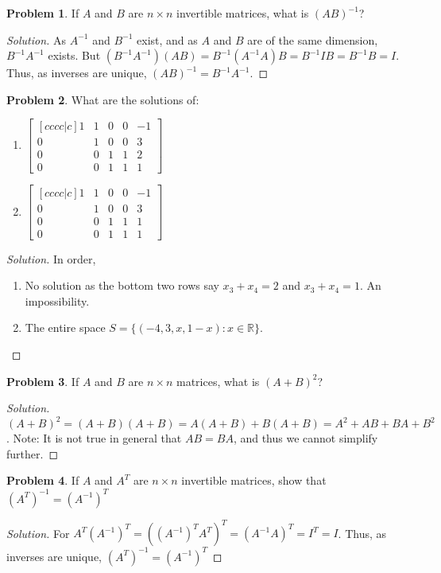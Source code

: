 \documentclass[oneside]{book}
\theoremstyle{definition}
\newtheorem{problem}{Problem}[section]
\begin{document}
\begin{problem}
If $A$ and $B$ are $n\times n$ invertible matrices, what is $(AB)^{-1}$?
\end{problem}
\begin{proof}[Solution]
As $A^{-1}$ and $B^{-1}$ exist, and as $A$ and $B$ are of the same dimension, $B^{-1}A^{-1}$ exists. But $(B^{-1}A^{-1})(AB) = B^{-1}(A^{-1}A)B = B^{-1}IB = B^{-1}B = I$. Thus, as inverses are unique, $(AB)^{-1} = B^{-1}A^{-1}$.
\end{proof}

\begin{problem}
What are the solutions of:
\begin{enumerate}
\item $\begin{bmatrix}[cccc|c] 1 & 1 & 0 & 0 & -1 \\ 0 & 1 & 0 & 0 & 3 \\ 0 & 0 & 1 & 1 & 2 \\ 0 & 0 & 1 & 1 & 1 \end{bmatrix}$
\item $\begin{bmatrix}[cccc|c] 1 & 1 & 0 & 0 & -1 \\ 0 & 1 & 0 & 0 & 3 \\ 0 & 0 & 1 & 1 & 1 \\ 0 & 0 & 1 & 1 & 1 \end{bmatrix}$
\end{enumerate}
\end{problem}
\begin{proof}[Solution]
In order,
\begin{enumerate}
\item No solution as the bottom two rows say $x_3 + x_4 = 2$ and $x_3 + x_4 = 1$. An impossibility.
\item The entire space $S = \{(-4,3,x,1-x):x\in \mathbb{R}\}$.
\end{enumerate}
\end{proof}

\begin{problem}
If $A$ and $B$ are $n\times n$ matrices, what is $(A+B)^2$?
\end{problem}
\begin{proof}[Solution]
$(A+B)^2 =(A+B)(A+B) = A(A+B)+B(A+B)=A^2+AB+BA+B^2$. Note: It is not true in general that $AB=BA$, and thus we cannot simplify further.
\end{proof}

\begin{problem}
If $A$ and $A^T$ are $n\times n$ invertible matrices, show that $(A^T)^{-1} = (A^{-1})^T$
\end{problem}
\begin{proof}[Solution]
For $A^T(A^{-1})^T = ((A^{-1})^T A^T)^T = (A^{-1}A)^T = I^T = I$. Thus, as inverses are unique, $(A^T)^{-1} = (A^{-1})^T$
\end{proof}
\end{document}

